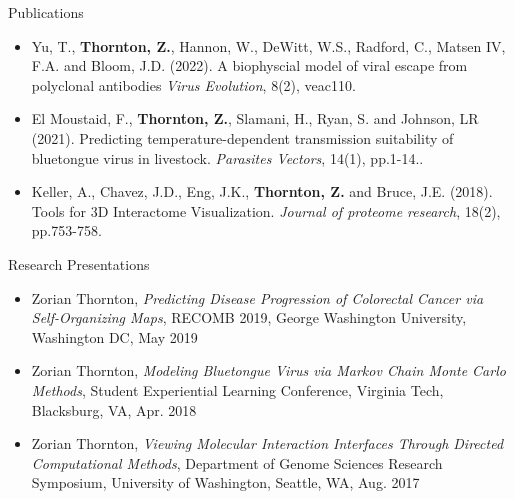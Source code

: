\documentclass{resume} %
\begin{document}
\begin{rSection}{Publications}

\begin{itemize}

    \item Yu, T., \textbf{Thornton, Z.}, Hannon, W., DeWitt, W.S., Radford, C., Matsen IV, F.A. and Bloom, J.D. (2022). A biophyscial model of viral escape from polyclonal antibodies \emph{Virus Evolution}, 8(2), veac110.

    \item El Moustaid, F., \textbf{Thornton, Z.}, Slamani, H., Ryan, S. and Johnson, LR (2021). Predicting temperature-dependent transmission suitability of bluetongue virus in livestock. \emph{Parasites Vectors}, 14(1), pp.1-14..

    \item Keller, A., Chavez, J.D., Eng, J.K., \textbf{Thornton, Z.} and Bruce, J.E. (2018). Tools for 3D Interactome Visualization. \emph{Journal of proteome research}, 18(2), pp.753-758.
\end{itemize}

\end{rSection}


\begin{rSection}{Research Presentations}
\begin{itemize}

    \item Zorian Thornton, \textit{Predicting Disease Progression of Colorectal Cancer via Self-Organizing Maps}, RECOMB 2019, George Washington University, Washington DC, May 2019

    \item Zorian Thornton, \textit{Modeling Bluetongue Virus via Markov Chain Monte Carlo Methods}, Student Experiential Learning Conference, Virginia Tech, Blacksburg, VA, Apr. 2018

    \item Zorian Thornton, \textit{Viewing Molecular Interaction Interfaces Through Directed Computational Methods}, Department of Genome Sciences Research Symposium, University of Washington, Seattle, WA, Aug. 2017

\end{itemize}


\end{rSection}
\end{document}
